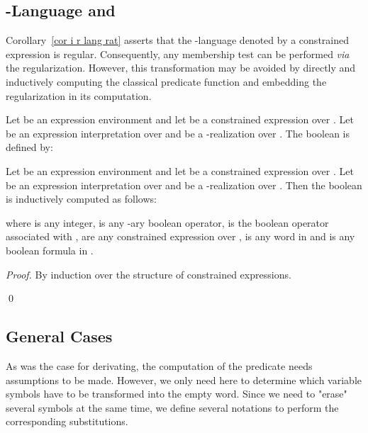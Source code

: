 \documentclass[a4paper]{llncs}
\begin{document}
  \subsection{-Language and }
  
  Corollary~\ref{cor i r lang rat} asserts that the -language denoted by a constrained expression is regular. Consequently, any membership test can be performed \emph{via} the regularization. However, this transformation may be avoided by directly and inductively computing the classical predicate function  and embedding the regularization in its computation.
  
  \begin{definition}[ Predicate]
    Let  be an expression environment and let  be a constrained expression over . Let  be  an expression interpretation over  and  be a -realization over . The boolean  is defined by:
        
  \end{definition}
  
  \begin{proposition}
    Let  be an expression environment and let  be a constrained expression over . Let  be  an expression interpretation over  and  be a -realization over . Then the boolean  is inductively computed as follows:
        
        where  is any integer,  is any -ary boolean operator,  is the boolean operator associated with ,  are any  constrained expression over ,  is any word in  and  is any boolean formula in .
  \end{proposition}
  \begin{proof}
    By induction over the structure of constrained expressions.
      \begin{multicols}{2}
        
      \end{multicols}
    \qed
  \end{proof}
  
  \subsection{General Cases}
  
  As was the case for derivating, the computation of the  predicate  needs assumptions to be made. However, we only need here to determine which variable symbols have to be transformed into the empty word. Since we need to "erase" several symbols at the same time, we define several notations to perform the corresponding substitutions.
  
\end{document}
